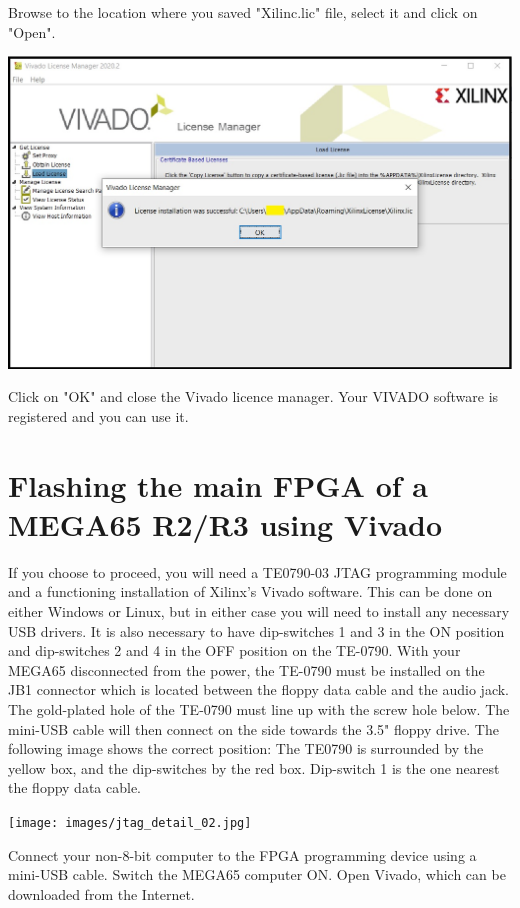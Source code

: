 Browse to the location where you saved "Xilinc.lic" file, select it and click on "Open".

\includegraphics[width=\linewidth]{images/VivadoInstimg032.jpg}

Click on "OK" and close the Vivado licence manager.
Your VIVADO software is registered and you can use it.



\section{Flashing the main FPGA of a MEGA65 R2/R3 using Vivado}
\label{sec:mainfpgaflashing}

If you choose to proceed, you will need a TE0790-03 JTAG programming module and a functioning
installation of Xilinx's Vivado software.  This can be done on either Windows or Linux, but
in either case you will need to install any necessary USB drivers. It is
also necessary to have
dip-switches 1 and 3 in the ON position and dip-switches 2 and 4 in the
OFF position on the TE-0790.
With your MEGA65 disconnected from the power, the TE-0790 must be
installed on the JB1 connector which is located between the floppy data cable and the audio jack.
The gold-plated hole of the TE-0790 must line up with the screw
hole below.  The mini-USB cable will then connect on the side towards the 3.5" floppy drive.
The following image shows the correct position: The TE0790 is surrounded by the yellow box,
and the dip-switches by the red box. Dip-switch 1 is the one nearest the floppy data cable.

\texttt{[image: images/jtag\_detail\_02.jpg]}

Connect your non-8-bit computer to the FPGA programming device using a
mini-USB cable. Switch the MEGA65 computer ON. Open Vivado, which can
be downloaded from the Internet.

